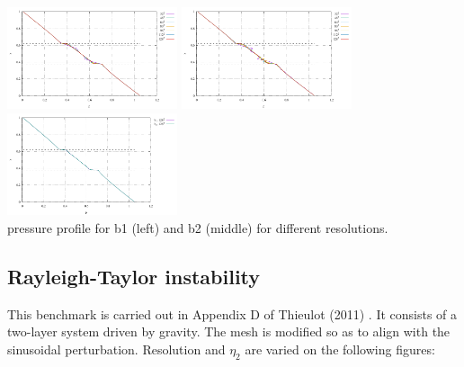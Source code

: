 \begin{center}
\includegraphics[width=5cm]{python_codes/fieldstone_72/results/sphere/pline_b1_open}
\includegraphics[width=5cm]{python_codes/fieldstone_72/results/sphere/pline_b2_open}
\includegraphics[width=5cm]{python_codes/fieldstone_72/results/sphere/pline_b12_open}\\
{\captionfont pressure profile for b1 (left) and b2 (middle) for different resolutions.}
\end{center}





\subsection*{Rayleigh-Taylor instability}

This benchmark is carried out in Appendix D of Thieulot (2011) \cite{thie11}.
It consists of a two-layer system driven by gravity.
The mesh is modified so as to align with the sinusoidal perturbation.
Resolution and $\eta_2$ are varied on the following figures:

